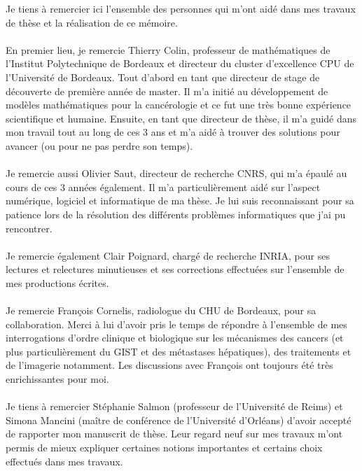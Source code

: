 Je tiens à remercier ici l'ensemble des personnes qui m'ont aidé dans mes travaux de thèse et la réalisation de ce mémoire.

\paragraph{}
En premier lieu, je remercie Thierry Colin, professeur de mathématiques de l'Institut Polytechnique de Bordeaux et directeur du cluster d'excellence CPU de l'Université de Bordeaux. Tout d'abord en tant que directeur de stage de découverte de première année de master. Il m'a initié au développement de modèles mathématiques pour la cancérologie et ce fut une très bonne expérience scientifique et humaine. Ensuite, en tant que directeur de thèse, il m'a guidé dans mon travail tout au long de ces 3 ans et m'a aidé à trouver des solutions pour avancer (ou pour ne pas perdre son temps). 

\paragraph{}
Je remercie aussi Olivier Saut, directeur %
de recherche CNRS, qui m'a épaulé au cours de ces 3 années également. Il m'a particulièrement aidé sur l'aspect numérique, logiciel et informatique de ma thèse. Je lui suis reconnaissant pour sa patience lors de la résolution des différents problèmes informatiques que j'ai pu rencontrer. 

\paragraph{}
Je remercie également Clair Poignard, chargé de recherche INRIA, pour ses lectures et relectures minutieuses et ses corrections effectuées sur l'ensemble de mes productions écrites. 

\paragraph{}
Je remercie François Cornelis, radiologue du CHU de Bordeaux, pour sa collaboration. Merci à lui d'avoir pris le temps de répondre à l'ensemble de mes interrogations d'ordre clinique et biologique sur les mécanismes des cancers (et plus particulièrement du GIST et des métastases hépatiques), des traitements et de l'imagerie notamment. Les discussions avec François ont toujours été très enrichissantes pour moi. 

\paragraph{}
Je tiens à remercier Stéphanie Salmon (professeur de l'Université de Reims) et Simona Mancini (maître de conférence de l'Université d'Orléans) d'avoir accepté de rapporter mon manuscrit de thèse. Leur regard neuf sur mes travaux m'ont permis de mieux expliquer certaines notions importantes et certains choix effectués dans mes travaux.


